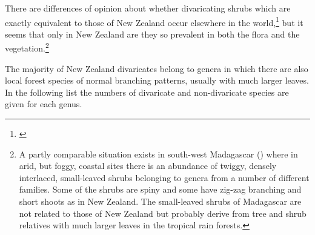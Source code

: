 There are differences of opinion about whether divaricating shrubs which are exactly equivalent to those of New Zealand occur elsewhere in the world,\footnote{\cite{greenwood1977evolution}} but it seems that only in New Zealand are they so prevalent in both the flora and the vegetation.\footnote{A partly comparable situation exists in south-west Madagascar (\cite{koechlinj1974flore}) where in arid, but foggy, coastal sites there is an abundance of twiggy, densely interlaced, small-leaved shrubs belonging to genera from a number of different families. Some of the shrubs are spiny and some have zig-zag branching and short shoots as in New Zealand. The small-leaved shrubs of Madagascar are not related to those of New Zealand but probably derive from tree and shrub relatives with much larger leaves in the tropical rain forests.}

The majority of New Zealand divaricates belong to genera in which there are also local forest species of normal branching patterns, usually with much larger leaves.
In the following list the numbers of divaricate and non-divaricate species are given for each genus.

